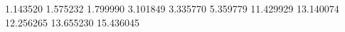 1.143520
1.575232
1.799990
3.101849
3.335770
5.359779
11.429929
13.140074
12.256265
13.655230
15.436045
